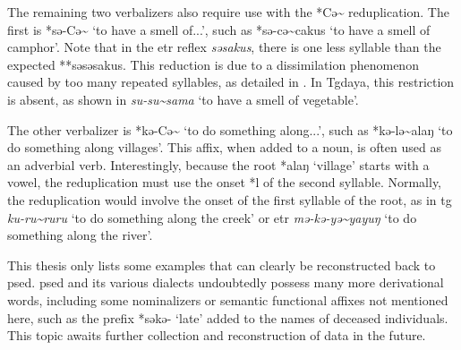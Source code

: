 
The remaining two verbalizers also require use with the *Cə\~{} reduplication. The first is *sə-Cə\~{} `to have a smell of...', such as *sə-cə\~{}cakus `to have a smell of camphor'. Note that in the \acl{etr} reflex \textit{səsakus}, there is one less syllable than the expected **səsəsakus. This reduction is due to a dissimilation phenomenon caused by too many repeated syllables, as detailed in \textcite[4]{lee2009odor}. In Tgdaya, this restriction is absent, as shown in \textit{su-su\~{}sama} `to have a smell of vegetable'.


The other verbalizer is *kə-Cə\~{} `to do something along...', such as *kə-lə\~{}alaŋ `to do something along villages'. This affix, when added to a noun, is often used as an adverbial verb. Interestingly, because the root *alaŋ `village' starts with a vowel, the reduplication must use the onset *l of the second syllable. Normally, the reduplication would involve the onset of the first syllable of the root, as in \acl{tg} \textit{ku-ru\~{}ruru} `to do something along the creek' or \acl{etr} \textit{mə-kə-yə\~{}yayuŋ} `to do something along the river'.


This thesis only lists some examples that can clearly be reconstructed back to \acl{psed}. \acl{psed} and its various dialects undoubtedly possess many more derivational words, including some nominalizers or semantic functional affixes not mentioned here, such as the prefix *səkə- `late' added to the names of deceased individuals. This topic awaits further collection and reconstruction of data in the future.

